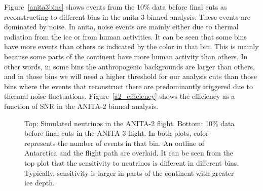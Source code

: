 Figure~\ref{anita3bins} shows events from the 10\% data before final cuts as reconstructing to different bins in the \gls{anita}-3 binned analysis. 
These events are dominated by noise. In \gls{anita}, noise events are mainly either due to thermal radiation from the ice or from human activities. It can be seen that some bins have more events than others as indicated by the color in that bin. This is mainly because some parts of the continent have more human activity than others. In other words, in some bins the anthropogenic backgrounds are larger than others, 
and in those bins we will need a higher 
threshold for our analysis cuts than those bins where
the events that reconstruct there are
predominantly triggered due to thermal noise fluctuations. Figure~\ref{a2_efficiency} shows the efficiency as a function of SNR in the ANITA-2 binned analysis.

\begin{figure}
\centering
{} \par
{}
\caption{Top: Simulated neutrinos in the ANITA-2 flight. Bottom: 10\% data before final cuts in the ANITA-3 flight. In both plots, color represents the number of events in that bin. An outline of Antarctica and the flight path are overlaid. It can be seen from the top plot that the sensitivity to neutrinos is different in different bins. Typically, sensitivity is larger in parts of the continent with greater ice depth.}
\label{bins}
\end{figure}

